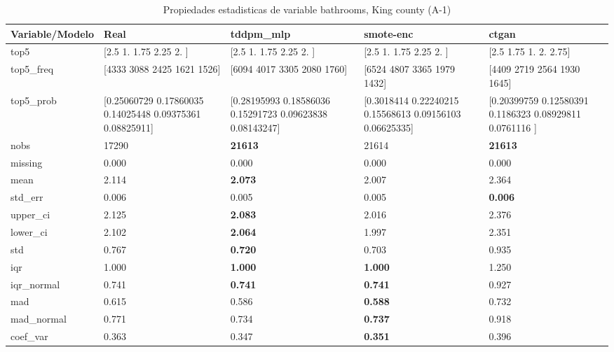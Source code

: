 \begin{table}[H]
\centering
\fontsize{8}{14}\selectfont
\caption{Propiedades  estadisticas de variable bathrooms, King county (A-1)}
\label{table-stats-king county-a-1-bathrooms}
\begin{tabular}{|l|m{10em}|m{10em}|m{10em}|m{10em}|}
\hline
 \rowcolor[gray]{0.8}
Variable/Modelo & Real & tddpm\_mlp & smote-enc & ctgan \\
\hline top5 & [2.5  1.   1.75 2.25 2.  ] & [2.5  1.   1.75 2.25 2.  ] & [2.5  1.   1.75 2.25 2.  ] & [2.5  1.75 1.   2.   2.75] \\
\hline top5\_freq & [4333 3088 2425 1621 1526] & [6094 4017 3305 2080 1760] & [6524 4807 3365 1979 1432] & [4409 2719 2564 1930 1645] \\
\hline top5\_prob & [0.25060729 0.17860035 0.14025448 0.09375361 0.08825911] & [0.28195993 0.18586036 0.15291723 0.09623838 0.08143247] & [0.3018414  0.22240215 0.15568613 0.09156103 0.06625335] & [0.20399759 0.12580391 0.1186323  0.08929811 0.0761116 ] \\
\hline nobs & 17290 & \bfseries 21613 & \cellcolor[rgb]{0.9, 0.54, 0.52} 21614 & \bfseries 21613 \\
\hline missing & 0.000 & 0.000 & 0.000 & 0.000 \\
\hline mean & 2.114 & \bfseries 2.073 & 2.007 & \cellcolor[rgb]{0.9, 0.54, 0.52} 2.364 \\
\hline std\_err & 0.006 & 0.005 & \cellcolor[rgb]{0.9, 0.54, 0.52} 0.005 & \bfseries 0.006 \\
\hline upper\_ci & 2.125 & \bfseries 2.083 & 2.016 & \cellcolor[rgb]{0.9, 0.54, 0.52} 2.376 \\
\hline lower\_ci & 2.102 & \bfseries 2.064 & 1.997 & \cellcolor[rgb]{0.9, 0.54, 0.52} 2.351 \\
\hline std & 0.767 & \bfseries 0.720 & 0.703 & \cellcolor[rgb]{0.9, 0.54, 0.52} 0.935 \\
\hline iqr & 1.000 & \bfseries 1.000 & \bfseries 1.000 & \cellcolor[rgb]{0.9, 0.54, 0.52} 1.250 \\
\hline iqr\_normal & 0.741 & \bfseries 0.741 & \bfseries 0.741 & \cellcolor[rgb]{0.9, 0.54, 0.52} 0.927 \\
\hline mad & 0.615 & 0.586 & \bfseries 0.588 & \cellcolor[rgb]{0.9, 0.54, 0.52} 0.732 \\
\hline mad\_normal & 0.771 & 0.734 & \bfseries 0.737 & \cellcolor[rgb]{0.9, 0.54, 0.52} 0.918 \\
\hline coef\_var & 0.363 & 0.347 & \bfseries 0.351 & \cellcolor[rgb]{0.9, 0.54, 0.52} 0.396 \\

\end{tabular}
\end{table}
